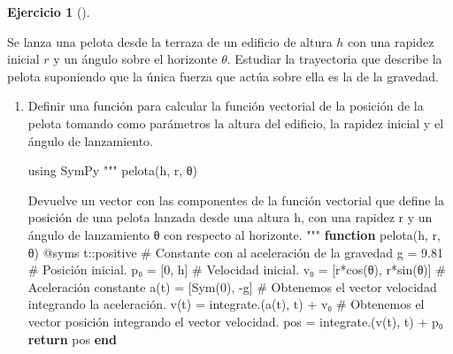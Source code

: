 \documentclass[
  a4paper,
]{scrreport}
\newenvironment{Shaded}{\begin{snugshade}}{\end{snugshade}}
\newcommand{\BuiltInTok}[1]{\textcolor[rgb]{0.00,0.23,0.31}{#1}}
\newcommand{\CommentTok}[1]{\textcolor[rgb]{0.37,0.37,0.37}{#1}}
\newcommand{\ControlFlowTok}[1]{\textcolor[rgb]{0.00,0.23,0.31}{\textbf{#1}}}
\newcommand{\DataTypeTok}[1]{\textcolor[rgb]{0.68,0.00,0.00}{#1}}
\newcommand{\FloatTok}[1]{\textcolor[rgb]{0.68,0.00,0.00}{#1}}
\newcommand{\FunctionTok}[1]{\textcolor[rgb]{0.28,0.35,0.67}{#1}}
\newcommand{\ImportTok}[1]{\textcolor[rgb]{0.00,0.46,0.62}{#1}}
\newcommand{\KeywordTok}[1]{\textcolor[rgb]{0.00,0.23,0.31}{\textbf{#1}}}
\newcommand{\NormalTok}[1]{\textcolor[rgb]{0.00,0.23,0.31}{#1}}
\newcommand{\OperatorTok}[1]{\textcolor[rgb]{0.37,0.37,0.37}{#1}}
\newcommand{\PreprocessorTok}[1]{\textcolor[rgb]{0.68,0.00,0.00}{#1}}
\newcommand{\StringTok}[1]{\textcolor[rgb]{0.13,0.47,0.30}{#1}}
\theoremstyle{definition}
\newtheorem{exercise}{Ejercicio}[chapter]
\theoremstyle{remark}
\begin{document}
\begin{exercise}[]\protect\hypertarget{exr-cinematica}{}\label{exr-cinematica}

Se lanza una pelota desde la terraza de un edificio de altura \(h\) con
una rapidez inicial \(r\) y un ángulo sobre el horizonte \(\theta\).
Estudiar la trayectoria que describe la pelota suponiendo que la única
fuerza que actúa sobre ella es la de la gravedad.

\begin{enumerate}
\def\labelenumi{\alph{enumi}.}
\item
  Definir una función para calcular la función vectorial de la posición
  de la pelota tomando como parámetros la altura del edificio, la
  rapidez inicial y el ángulo de lanzamiento.

  \begin{tcolorbox}[enhanced jigsaw, bottomtitle=1mm, rightrule=.15mm, left=2mm, colback=white, title=\textcolor{quarto-callout-tip-color}{\faLightbulb}\hspace{0.5em}{Solución}, bottomrule=.15mm, colframe=quarto-callout-tip-color-frame, toprule=.15mm, leftrule=.75mm, opacityback=0, coltitle=black, breakable, colbacktitle=quarto-callout-tip-color!10!white, arc=.35mm, toptitle=1mm, titlerule=0mm, opacitybacktitle=0.6]

\begin{Shaded}
\begin{Highlighting}[]
\ImportTok{using} \BuiltInTok{SymPy}
\StringTok{"""}
\StringTok{    pelota(h, r, θ)}

\StringTok{Devuelve un vector con las componentes de la función vectorial que define la posición de una pelota lanzada desde una altura h, con una rapidez r y un ángulo de lanzamiento θ con respecto al horizonte.}
\StringTok{"""}
\KeywordTok{function} \FunctionTok{pelota}\NormalTok{(h, r, θ)}
    \PreprocessorTok{@syms}\NormalTok{ t}\OperatorTok{::}\DataTypeTok{positive}
    \CommentTok{\# Constante con al aceleración de la gravedad}
\NormalTok{    g }\OperatorTok{=} \FloatTok{9.81}
    \CommentTok{\# Posición inicial.}
\NormalTok{    p₀ }\OperatorTok{=}\NormalTok{ [}\FloatTok{0}\NormalTok{, h] }
    \CommentTok{\# Velocidad inicial.}
\NormalTok{    v₀ }\OperatorTok{=}\NormalTok{ [}\FunctionTok{r*cos}\NormalTok{(θ), }\FunctionTok{r*sin}\NormalTok{(θ)]}
    \CommentTok{\# Aceleración constante}
    \FunctionTok{a}\NormalTok{(t) }\OperatorTok{=}\NormalTok{ [}\FunctionTok{Sym}\NormalTok{(}\FloatTok{0}\NormalTok{), }\OperatorTok{{-}}\NormalTok{g]}
    \CommentTok{\# Obtenemos el vector velocidad integrando la aceleración.}
    \FunctionTok{v}\NormalTok{(t) }\OperatorTok{=} \FunctionTok{integrate}\NormalTok{.(}\FunctionTok{a}\NormalTok{(t), t) }\OperatorTok{+}\NormalTok{ v₀}
    \CommentTok{\# Obtenemos el vector posición integrando el vector velocidad.}
\NormalTok{    pos }\OperatorTok{=} \FunctionTok{integrate}\NormalTok{.(}\FunctionTok{v}\NormalTok{(t), t) }\OperatorTok{+}\NormalTok{ p₀}
    \ControlFlowTok{return}\NormalTok{ pos}
\KeywordTok{end}
\end{Highlighting}
\end{Shaded}


\end{tcolorbox}
\end{enumerate}
\end{exercise}
\end{document}

